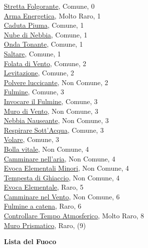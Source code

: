 \begin{multicols}{3}
{{\hyperlink{Stretta Folgorante}{Stretta Folgorante}, Comune, 0\\
\hyperlink{Arma Energetica}{Arma Energetica}, Molto Raro, 1\\
\hyperlink{Caduta Piuma}{Caduta Piuma}, Comune, 1\\
\hyperlink{Nube di Nebbia}{Nube di Nebbia}, Comune, 1\\
\hyperlink{Onda Tonante}{Onda Tonante}, Comune, 1\\
\hyperlink{Saltare}{Saltare}, Comune, 1\\
\hyperlink{Folata di Vento}{Folata di Vento}, Comune, 2\\
\hyperlink{Levitazione}{Levitazione}, Comune, 2\\
\hyperlink{Polvere luccicante}{Polvere luccicante}, Non Comune, 2\\
\hyperlink{Fulmine}{Fulmine}, Comune, 3\\
\hyperlink{Invocare il Fulmine}{Invocare il Fulmine}, Comune, 3\\
\hyperlink{Muro di Vento}{Muro di Vento}, Non Comune, 3\\
\hyperlink{Nebbia Nauseante}{Nebbia Nauseante}, Non Comune, 3\\
\hyperlink{Respirare Sott'Acqua}{Respirare Sott'Acqua}, Comune, 3\\
\hyperlink{Volare}{Volare}, Comune, 3\\
\hyperlink{Bolla vitale}{Bolla vitale}, Non Comune, 4\\
\hyperlink{Camminare nell'aria}{Camminare nell'aria}, Non Comune, 4\\
\hyperlink{Evoca Elementali Minori}{Evoca Elementali Minori}, Non Comune, 4\\
\hyperlink{Tempesta di Ghiaccio}{Tempesta di Ghiaccio}, Non Comune, 4\\
\hyperlink{Evoca Elementale}{Evoca Elementale}, Raro, 5\\
\hyperlink{Camminare nel Vento}{Camminare nel Vento}, Non Comune, 6\\
\hyperlink{Fulmine a catena}{Fulmine a catena}, Raro, 6\\
\hyperlink{Controllare Tempo Atmosferico}{Controllare Tempo Atmosferico}, Molto Raro, 8\\
\hyperlink{Muro Prismatico}{Muro Prismatico}, Raro, (9)

\medskip\textbf{Lista del Fuoco}

}}
\end{multicols}
